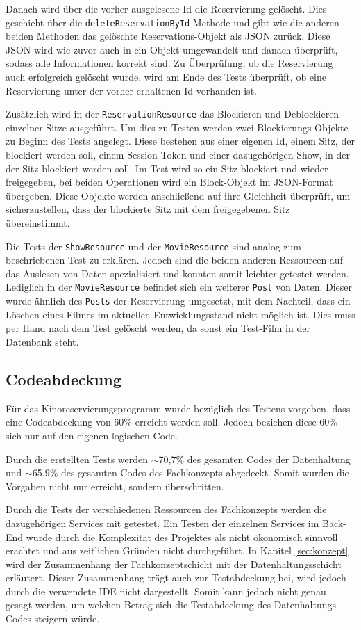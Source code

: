 Danach wird über die vorher ausgelesene Id die Reservierung gelöscht. Dies geschieht über die \texttt{deleteReservationById}-Methode und gibt wie die anderen beiden Methoden das gelöschte Reservations-Objekt als \acs{JSON} zurück.
Diese \acs{JSON} wird wie zuvor auch in ein Objekt umgewandelt und danach überprüft, sodass alle Informationen korrekt sind.
Zu Überprüfung, ob die Reservierung auch erfolgreich gelöscht wurde, wird am Ende des Tests überprüft, ob eine Reservierung unter der vorher erhaltenen Id vorhanden ist.

Zusätzlich wird in der \texttt{ReservationResource} das Blockieren und Deblockieren einzelner Sitze ausgeführt. Um dies zu Testen werden zwei Blockierungs-Objekte zu Beginn des Tests angelegt.
Diese bestehen aus einer eigenen Id, einem Sitz, der blockiert werden soll, einem Session Token und einer dazugehörigen Show, in der der Sitz blockiert werden soll.
Im Test wird so ein Sitz blockiert und wieder freigegeben, bei beiden Operationen wird ein Block-Objekt im \acs{JSON}-Format übergeben.
Diese Objekte werden anschließend auf ihre Gleichheit überprüft, um sicherzustellen, dass der blockierte Sitz mit dem freigegebenen Sitz übereinstimmt.

Die Tests der \texttt{ShowResource} und der \texttt{MovieResource} sind analog zum beschriebenen Test zu erklären.
Jedoch sind die beiden anderen Ressourcen auf das Auslesen von Daten spezialisiert und konnten somit leichter getestet werden.
Lediglich in der \texttt{MovieResource} befindet sich ein weiterer \texttt{Post} von Daten.
Dieser wurde ähnlich des \texttt{Posts} der Reservierung umgesetzt, mit dem Nachteil, dass ein Löschen eines Filmes im aktuellen Entwicklungsstand nicht möglich ist.
Dies muss per Hand nach dem Test gelöscht werden, da sonst ein Test-Film in der Datenbank steht.

\subsection{Codeabdeckung} 
\label{sec:codeabdeckung}
Für das Kinoreservierungsprogramm wurde bezüglich des Testens vorgeben, dass eine Codeabdeckung von 60\% erreicht werden soll.
Jedoch beziehen diese 60\% sich nur auf den eigenen logischen Code.

Durch die erstellten Tests werden $\sim$70,7\% des gesamten Codes der Datenhaltung und $\sim$65,9\% des gesamten Codes des Fachkonzepts abgedeckt.
Somit wurden die Vorgaben nicht nur erreicht, sondern überschritten.

Durch die Tests der verschiedenen Ressourcen des Fachkonzepts werden die dazugehörigen Services mit getestet.
Ein Testen der einzelnen Services im Back-End wurde durch die Komplexität des Projektes als nicht ökonomisch sinnvoll erachtet und aus zeitlichen Gründen nicht durchgeführt.
In Kapitel \vref{sec:konzept} wird der Zusammenhang der Fachkonzeptschicht mit der Datenhaltungsschicht erläutert.
Dieser Zusammenhang trägt auch zur Testabdeckung bei, wird jedoch durch die verwendete \acs{IDE} nicht dargestellt.
Somit kann jedoch nicht genau gesagt werden, um welchen Betrag sich die Testabdeckung des Datenhaltungs-Codes steigern würde.
